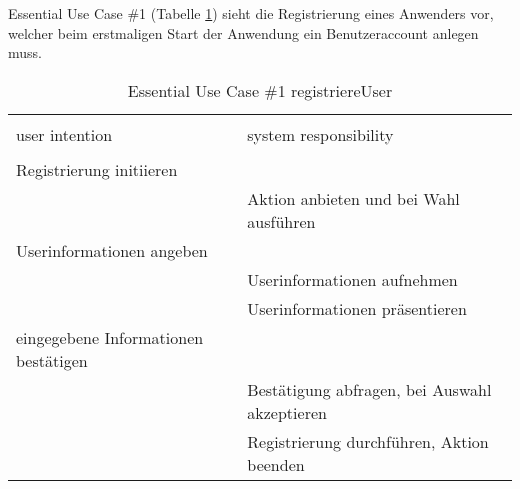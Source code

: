 Essential Use Case \#1 (Tabelle \ref{tab:registrieren}) sieht die Registrierung eines Anwenders vor, welcher beim erstmaligen Start der Anwendung ein Benutzeraccount anlegen muss.
\begin{table}[H]
\caption{Essential Use Case \#1 registriereUser }
\centering
\begin{tabular}{l l}
\\ [-0.5ex]

\hline\hline
\\ [-0.5ex]
user intention & system responsibility
\\ [1.5ex]
\hline
\\ [-0.5ex]
Registrierung initiieren            &                                \\[1ex]
                              & Aktion anbieten und bei Wahl ausführen  \\[1ex]
Userinformationen angeben           &                                \\[1ex] 
                              & Userinformationen aufnehmen          \\[1ex]
                              & Userinformationen präsentieren       \\[1ex]
eingegebene Informationen bestätigen   &                                \\[1ex]
                              & Bestätigung abfragen, bei Auswahl akzeptieren  \\[1ex]
                              & Registrierung durchführen, Aktion beenden  \\[1ex]


\hline
\end{tabular}
\label{tab:registrieren}
\end{table}

